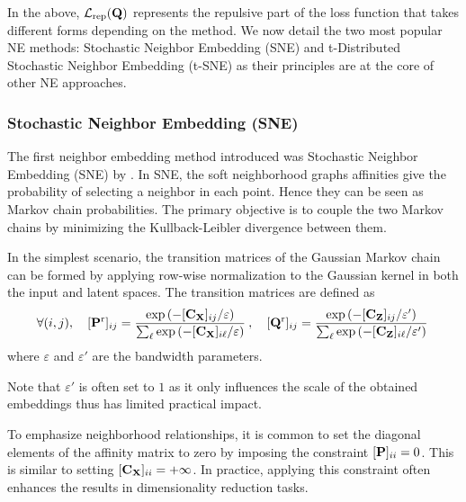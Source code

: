 In the above, \(\mathcal{L}_{\mathrm{rep}}({\mathbf{Q}})\) represents the repulsive part of the loss function that takes different forms depending on the method. We now detail the two most popular NE methods: Stochastic Neighbor Embedding (SNE) and t-Distributed Stochastic Neighbor Embedding (t-SNE) as their principles are at the core of other NE approaches.

\subsubsection{Stochastic Neighbor Embedding (SNE)}

The first neighbor embedding method introduced was Stochastic Neighbor Embedding (SNE) by \cite{hinton2002stochastic}. In SNE, the soft neighborhood graphs affinities give the probability of selecting a neighbor in each point. Hence they can be seen as Markov chain probabilities. The primary objective is to couple the two Markov chains by minimizing the Kullback-Leibler divergence between them. 

In the simplest scenario, the transition matrices of the Gaussian Markov chain can be formed by applying row-wise normalization to the Gaussian kernel in both the input and latent spaces. The transition matrices are defined as
\begin{align}
    \forall (i,j), \quad [{\mathbf{P}}^{\mathrm{r}}]_{ij} = \frac{\exp{(-[{\mathbf{C}}_{{\mathbf{X}}}]_{ij} / \varepsilon)}}{\sum_\ell \exp{(-[{\mathbf{C}}_{{\mathbf{X}}}]_{i\ell} / \varepsilon)} } \:, \quad [{\mathbf{Q}}^{\mathrm{r}}]_{ij} = \frac{\exp{(-[{\mathbf{C}}_{{\mathbf{Z}}}]_{ij} / \varepsilon')}}{\sum_\ell \exp{(-[{\mathbf{C}}_{{\mathbf{Z}}}]_{i\ell} / \varepsilon')}} \,
\end{align}
where $\varepsilon$ and $\varepsilon'$ are the bandwidth parameters.

\begin{remark}
    Note that $\varepsilon'$ is often set to $1$ as it only influences the scale of the obtained embeddings thus has limited practical impact.
\end{remark}

\begin{remark}
    To emphasize neighborhood relationships, it is common to set the diagonal elements of the affinity matrix to zero by imposing the constraint $[{\mathbf{P}}]_{ii} = 0$. This is similar to setting $[{\mathbf{C}}_{{\mathbf{X}}}]_{ii} = +\infty$. In practice, applying this constraint often enhances the results in dimensionality reduction tasks.
\end{remark}
    


